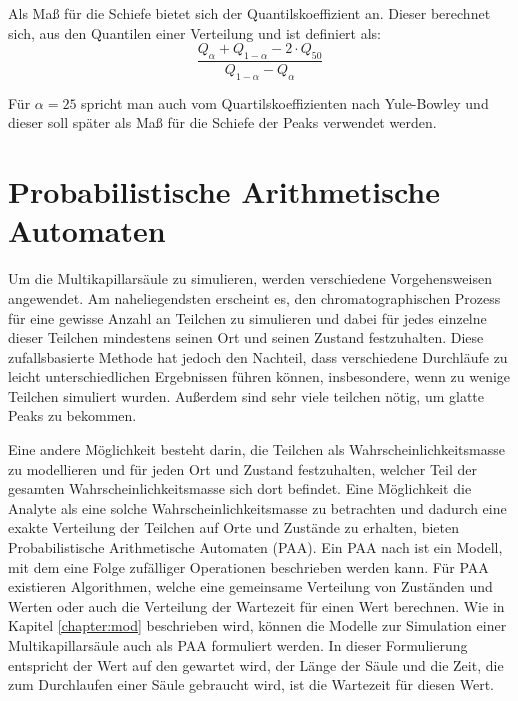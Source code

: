Als Maß für die Schiefe bietet sich der Quantilskoeffizient \citep{johnson1994} an.
Dieser berechnet sich, aus den Quantilen einer Verteilung und ist definiert als: 
\begin{equation}
\frac{Q_{\alpha} + Q_{1-\alpha} -2\cdot Q_{50} }{ Q_{1-\alpha} - Q_{\alpha}}
\end{equation}

Für $\alpha = 25$ spricht man auch vom Quartilskoeffizienten nach Yule-Bowley und dieser soll später als Maß für die Schiefe der Peaks verwendet werden.


\section{Probabilistische Arithmetische Automaten}
Um die Multikapillarsäule zu simulieren, werden verschiedene Vorgehensweisen angewendet. Am naheliegendsten erscheint es, den chromatographischen Prozess für eine gewisse Anzahl an Teilchen zu simulieren und dabei für jedes einzelne dieser Teilchen mindestens seinen Ort und seinen Zustand festzuhalten. Diese zufallsbasierte Methode hat jedoch den Nachteil, dass verschiedene Durchläufe zu leicht unterschiedlichen Ergebnissen führen können, insbesondere, wenn zu wenige Teilchen simuliert wurden.
Außerdem sind sehr viele teilchen nötig, um glatte Peaks zu bekommen.

Eine andere Möglichkeit besteht darin, die Teilchen als Wahrscheinlichkeitsmasse zu modellieren und für jeden Ort und Zustand festzuhalten, welcher Teil der gesamten Wahrscheinlichkeitsmasse sich dort befindet.
Eine Möglichkeit die Analyte als eine solche Wahrscheinlichkeitsmasse zu betrachten und dadurch eine exakte Verteilung der Teilchen auf Orte und Zustände zu erhalten, bieten Probabilistische Arithmetische Automaten (PAA).
Ein PAA nach \cite{MHKR} ist ein Modell, mit dem eine Folge zufälliger Operationen beschrieben werden kann. 
Für PAA existieren Algorithmen, welche eine gemeinsame Verteilung von Zuständen und Werten oder auch die Verteilung der Wartezeit für einen Wert berechnen. Wie in Kapitel \ref{chapter:mod} beschrieben wird, können die Modelle zur Simulation einer Multikapillarsäule auch als PAA formuliert werden. 
In dieser Formulierung entspricht der Wert auf den gewartet wird, der Länge der Säule und die Zeit, die zum Durchlaufen einer Säule gebraucht wird, ist die Wartezeit für diesen Wert. %

